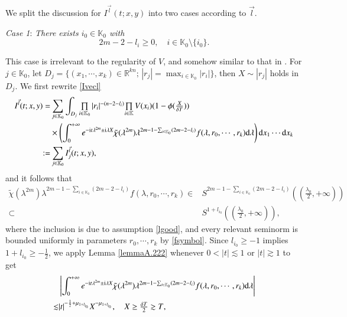 \documentclass[11pt,reqno]{amsart}
\def\d{{\rm d}}
\numberwithin{equation}{section}
\theoremstyle{definition}
\begin{document}
We split the discussion for $I^{\vec{l}}(t;x,y)$ into two cases according to $\vec{l}$.

\noindent\emph{Case 1}: \textit{There exists $i_0\in\mathbb{K}_0$ with}
\begin{equation}\label{lgood}
	2m-2-l_i\geq0,\quad i\in\mathbb{K}_0\setminus\{i_0\}.
\end{equation}

This case is irrelevant to the regularity of $V$, and somehow similar to that in \cite{CHHZ}. For $j\in\mathbb{K}_0$, let $D_j=\{(x_1,\cdots,x_k)\in\mathbb{R}^{kn};\,|r_j|=\max_{i\in\mathbb{K}_0}|r_i|\}$, then $X\sim|r_j|$ holds in $D_j$. We first rewrite \eqref{Ivecl}
\begin{equation*}
	\begin{split}
		I^{\vec{l}}(t;x,y)=&\sum_{j\in\mathbb{K}_0}\int_{D_j}\mbox{$\prod\limits_{i\in\mathbb{K}_0}|r_i|^{-(n-2-l_i)}$}\mbox{$\prod\limits_{i\in\mathbb{K}}V(x_i)$}(1-\phi(\mbox{$\frac{X}{\delta T}$}))\\
		&\times\left(\int_0^{+\infty}e^{-\mathrm{i}t\lambda^{2m}\pm\mathrm{i}\lambda X}\tilde{\chi}(\lambda^{2m})\lambda^{2m-1-\sum_{i\in\mathbb{K}_0}(2m-2-l_i)}f(\lambda,r_0,\cdots,r_k)\d\lambda\right)\d x_1\cdots \d x_k\\
		:=&\sum_{j\in\mathbb{K}_0}I_j^{\vec{l}}(t;x,y),
	\end{split}
\end{equation*}
and it follows that
\begin{equation}\label{symbolinitial}
	\begin{split}
		\tilde{\chi}(\lambda^{2m})\lambda^{2m-1-\sum_{i\in\mathbb{K}_0}(2m-2-l_i)}f(\lambda,r_0,\cdots,r_k)\in&S^{2m-1-\sum_{i\in\mathbb{K}_0}(2m-2-l_i)}\left((\mbox{$\frac{\lambda_0}{2},+\infty$})\right)\\
		\subset&S^{1+l_{i_0}}\left((\mbox{$\frac{\lambda_0}{2},+\infty$})\right),
	\end{split}
\end{equation}
where the inclusion is due to assumption \eqref{lgood}, and every relevant seminorm is bounded uniformly in parameters $r_0,\cdots,r_k$ by \eqref{fsymbol}. Since $l_{i_0}\geq-1$ implies $1+l_{i_0}\geq-\frac12$, we apply Lemma \ref{lemmaA.222} whenever $0<|t|\lesssim1$ or $|t|\gtrsim1$ to get
\begin{equation*}
	\begin{split}
		&\left|\int_0^{+\infty}e^{-\mathrm{i}t\lambda^{2m}\pm\mathrm{i}\lambda X}\tilde{\chi}(\lambda^{2m})\lambda^{2m-1-\sum_{i\in\mathbb{K}_0}(2m-2-l_i)}f(\lambda,r_0,\cdots,r_k)\d\lambda\right|\\
		\lesssim&|t|^{-\frac12+\mu_{1+l_{i_0}}}X^{-\mu_{1+l_{i_0}}},\quad \mbox{$X\geq\frac{\delta T}{2}\gtrsim T$},
	\end{split}
\end{equation*}
\end{document}

